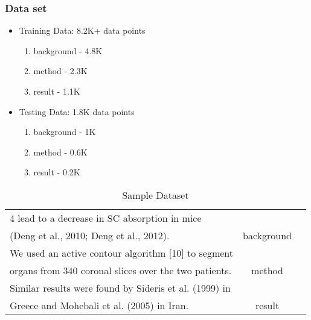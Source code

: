 \documentclass[
  xcolor={svgnames},
  hyperref={colorlinks,citecolor=DeepPink4,linkcolor=DarkRed,urlcolor=DarkBlue}
  ]{beamer}
\begin{document}
\begin{frame}
\frametitle{Data set}

\begin{itemize}
\item Training Data: 8.2K+ data points
	\begin{enumerate}
		\item background - 4.8K
		\item method - 2.3K
		\item result - 1.1K
	\end{enumerate}
\item Testing Data: 1.8K data points
	\begin{enumerate}
		\item background - 1K
		\item method - 0.6K
		\item result - 0.2K
	\end{enumerate}
\end{itemize}

\begin{table}
	\begin{tabular}{| l | c | c} \hline
		 4 lead to a decrease in SC absorption in mice & \\
		 (Deng et al., 2010; Deng et al., 2012). & background \\
		  \hline
		 We used an active contour algorithm [10] to segment & \\
		 organs from 340 coronal slices over the two patients. & method \\
		  \hline
		 Similar results were found by Sideris et al. (1999) in & \\
		 Greece and Mohebali et al. (2005) in Iran. & result \\
		  \hline
	 \end{tabular}

\caption{Sample Dataset}
\end{table}

\end{frame}
\end{document}
